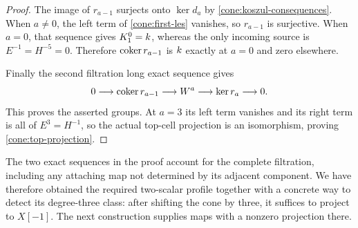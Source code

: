 \begin{proof}
The image of $r_{a-1}$ surjects onto $\ker d_a$ by
\eqref{cone:koszul-consequences}. When $a\ne0$, the left term of
\eqref{cone:first-les} vanishes, so $r_{a-1}$ is surjective.
When $a=0$, that sequence gives $K_1^0=k$, whereas the only incoming
source is $E^{-1}=H^{-5}=0$. Therefore $\operatorname{coker} r_{a-1}$ is $k$ exactly
at $a=0$ and zero elsewhere.

Finally the second filtration long exact sequence gives
\[
 0\longrightarrow\operatorname{coker} r_{a-1}\longrightarrow W^a
 \longrightarrow\ker r_a\longrightarrow0.
\]
This proves the asserted groups. At $a=3$ its left term vanishes and its
right term is all of $E^3=H^{-1}$, so the actual top-cell projection is
an isomorphism, proving \eqref{cone:top-projection}.
\end{proof}

The two exact sequences in the proof account for the complete filtration,
including any attaching map not determined by its adjacent component.
We have therefore obtained the required two-scalar profile together with
a concrete way to detect its degree-three class: after shifting the cone
by three, it suffices to project to $X[-1]$. The next construction supplies
maps with a nonzero projection there.
